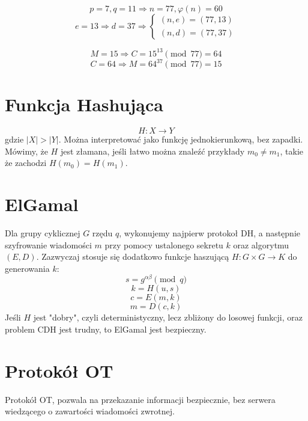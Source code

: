 \documentclass{../notatki}
\begin{document}
$$
p = 7, q = 11 \Rightarrow n = 77, \varphi(n) = 60
$$
$$
e = 13 \Rightarrow d = 37 \Rightarrow
\begin{cases}
  (n, e) = (77, 13) \\
  (n, d) = (77, 37)
\end{cases}
$$

$$
M = 15 \Rightarrow C = 15^{13} \pmod{77} = 64
$$
$$
C = 64 \Rightarrow M = 64^{37} \pmod{77} = 15
$$

\section{Funkcja Hashująca}

$$
H: X \to Y
$$
gdzie $|X| > |Y|$. Można interpretować jako funkcję jednokierunkową, bez
zapadki. Mówimy, że $H$ jest złamana, jeśli łatwo można znaleźć
przykłady $m_0 \neq m_1$, takie że zachodzi $H(m_0) = H(m_1)$.

\section{ElGamal}

Dla grupy cyklicznej $G$ rzędu $q$, wykonujemy najpierw protokoł DH, a następnie
szyfrowanie wiadomości $m$ przy pomocy ustalonego sekretu $k$ oraz
algorytmu $(E, D)$. Zazwyczaj stosuje
się dodatkowo funkcje haszującą $H: G \times G \to K$ do generowania $k$:
$$
s = g^{\alpha\beta} \pmod{q}
$$
$$
k = H(u, s)
$$
$$
c = E(m, k)
$$
$$
m = D(c, k)
$$
Jeśli $H$ jest "dobry", czyli deterministyczny, lecz zbliżony do
losowej funkcji, oraz problem CDH jest trudny, to ElGamal jest bezpieczny.

\section{Protokół OT}

Protokół OT, pozwala na przekazanie informacji bezpiecznie, bez serwera
wiedzącego o zawartości wiadomości zwrotnej.
\end{document}
